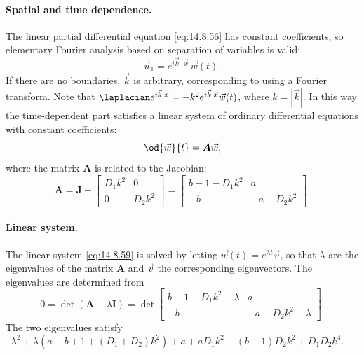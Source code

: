 \paragraph{Spatial and time dependence.}
The linear partial differential equation \eqref{eq:14.8.56} has constant coefficients, so elementary Fourier analysis based on separation of variables is valid:
\begin{equation}
\vec{u}_1 = e^{i\vec{k}\cdot\vec{x}}\,\vec{w}(t).
\label{eq:14.8.58}
\end{equation}
If there are no boundaries, $\vec{k}$ is arbitrary, corresponding to using a Fourier transform. Note that $\laplacian e^{i\vec{k}\cdot\vec{x}} = -k^2 e^{i\vec{k}\cdot\vec{x}}\vec{w}(t)$, where $k = |\vec{k}|$. In this way the time-dependent part satisfies a linear system of ordinary differential equations with constant coefficients:
\begin{equation}
\od{\vec{w}}{t} = \boldsymbol{A}\vec{w},
\label{eq:14.8.59}
\end{equation}
where the matrix $\boldsymbol{A}$ is related to the Jacobian:
\begin{equation}
\boldsymbol{A} = \boldsymbol{J} - \begin{bmatrix} D_1 k^2 & 0 \\ 0 & D_2 k^2 \end{bmatrix} = \begin{bmatrix} b - 1 - D_1 k^2 & a \\ -b & -a - D_2 k^2 \end{bmatrix}.
\label{eq:14.8.60}
\end{equation}

\paragraph{Linear system.}
The linear system \eqref{eq:14.8.59} is solved by letting $\vec{w}(t) = e^{\lambda t}\vec{v}$, so that $\lambda$ are the eigenvalues of the matrix $\boldsymbol{A}$ and $\vec{v}$ the corresponding eigenvectors. The eigenvalues are determined from
\begin{equation}
0 = \det(\boldsymbol{A} - \lambda\boldsymbol{I}) = \det\begin{bmatrix} b - 1 - D_1 k^2 - \lambda & a \\ -b & -a - D_2 k^2 - \lambda \end{bmatrix}.
\label{eq:14.8.61}
\end{equation}
The two eigenvalues satisfy
\begin{equation}
\lambda^2 + \lambda(a - b + 1 + (D_1 + D_2)k^2) + a + aD_1 k^2 - (b-1)D_2 k^2 + D_1 D_2 k^4. \quad
\label{eq:14.8.62}
\end{equation}

